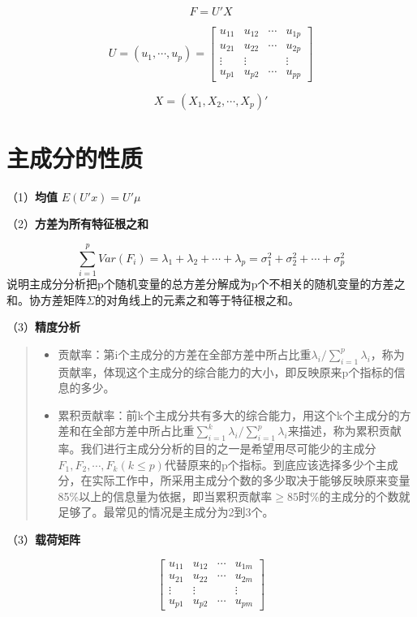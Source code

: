 \documentclass[]{ctexbook}
\providecommand{\tightlist}{%
  \setlength{\itemsep}{0pt}\setlength{\parskip}{0pt}}
\begin{document}
\[F=U'X\]

\[U=(u_1,\cdots,u_p)=\begin {bmatrix} u_{11} & u_{12} & \cdots & u_{1p} \\ u_{21} & u_{22} & \cdots & u_{2p} \\ \vdots & \vdots & & \vdots \\ u_{p1} & u_{p2} & \cdots & u_{pp} \end {bmatrix}\]

\[X=(X_1,X_2,\cdots,X_p)'\]

\hypertarget{ux4e3bux6210ux5206ux7684ux6027ux8d28}{%
\section{主成分的性质}\label{ux4e3bux6210ux5206ux7684ux6027ux8d28}}

（1）\textbf{均值} \(E(U'x)=U'\mu\)

（2）\textbf{方差为所有特征根之和}

\[\sum_{i=1}^pVar(F_i)=\lambda_1+\lambda_2+\cdots+\lambda_p=\sigma_1^2+\sigma_2^2+\cdots+\sigma_p^2\]
说明主成分分析把p个随机变量的总方差分解成为p个不相关的随机变量的方差之和。协方差矩阵\(\Sigma\)的对角线上的元素之和等于特征根之和。

（3）\textbf{精度分析}

\begin{quote}
\begin{itemize}
\tightlist
\item
  贡献率：第i个主成分的方差在全部方差中所占比重\(\lambda_i/\sum_{i=1}^p\lambda_i\)，称为贡献率，体现这个主成分的综合能力的大小，即反映原来p个指标的信息的多少。
\item
  累积贡献率：前k个主成分共有多大的综合能力，用这个k个主成分的方差和在全部方差中所占比重\(\sum_{i=1}^k\lambda_i/\sum_{i=1}^p\lambda_i\)来描述，称为累积贡献率。我们进行主成分分析的目的之一是希望用尽可能少的主成分\(F_1,F_2,\cdots,F_k(k\le p)\)代替原来的p个指标。到底应该选择多少个主成分，在实际工作中，所采用主成分个数的多少取决于能够反映原来变量85\%以上的信息量为依据，即当累积贡献率\(\geq85\)时\%的主成分的个数就足够了。最常见的情况是主成分为2到3个。
\end{itemize}
\end{quote}

（3）\textbf{载荷矩阵}

\[\begin {bmatrix} u_{11} & u_{12} & \cdots & u_{1m} \\ u_{21} & u_{22} & \cdots & u_{2m} \\ \vdots & \vdots & & \vdots \\ u_{p1} & u_{p2} & \cdots & u_{pm} \end {bmatrix}\]
\end{document}
